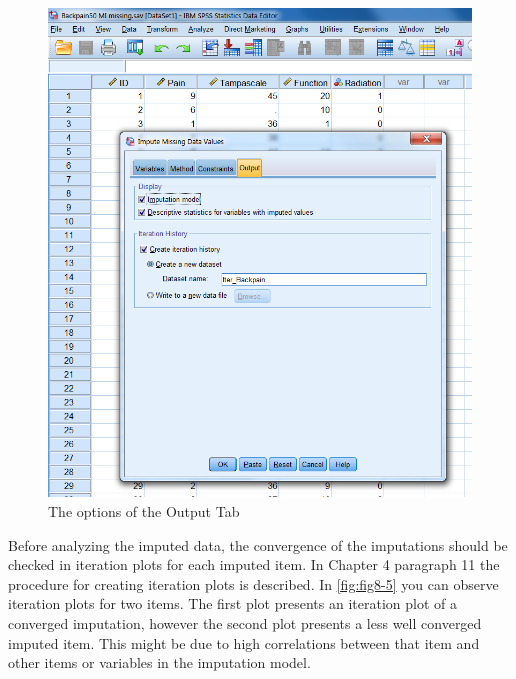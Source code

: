 \documentclass[
]{book}
\begin{document}
\begin{figure}

{\centering \includegraphics[width=0.9\linewidth]{images/fig8.4} 

}

\caption{The options of the Output Tab}\label{fig:fig8-4}
\end{figure}

Before analyzing the imputed data, the convergence of the imputations should be checked in iteration plots for each imputed item. In Chapter 4 paragraph 11 the procedure for creating iteration plots is described. In \ref{fig:fig8-5} you can observe iteration plots for two items. The first plot presents an iteration plot of a converged imputation, however the second plot presents a less well converged imputed item. This might be due to high correlations between that item and other items or variables in the imputation model.
\end{document}
